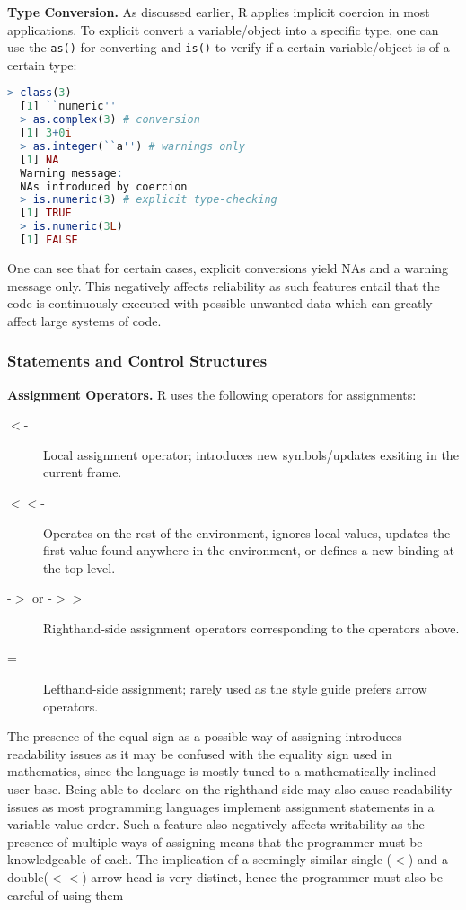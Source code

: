 \documentclass[12pt]{article}
\begin{document}
\textbf{Type Conversion.} As discussed earlier, R applies implicit coercion in most applications. To explicit convert a variable/object into a specific type, one can use the \texttt{as()} for converting and \texttt{is()} to verify if a certain variable/object is of a certain type:

\begin{lstlisting}[language=R ]
  > class(3)
  [1] ``numeric''
  > as.complex(3) # conversion
  [1] 3+0i
  > as.integer(``a'') # warnings only
  [1] NA
  Warning message:
  NAs introduced by coercion
  > is.numeric(3) # explicit type-checking
  [1] TRUE
  > is.numeric(3L)
  [1] FALSE
\end{lstlisting}

One can see that for certain cases, explicit conversions yield NAs and a warning message only. This negatively affects reliability as such features entail that the code is continuously executed with possible unwanted data which can greatly affect large systems of code.

\subsubsection{Statements and Control Structures}

\textbf{Assignment Operators.} R uses the following operators for assignments:

\begin{description}
\item[\(<\)-] Local assignment operator; introduces new symbols/updates exsiting in the current frame.
\item[\(<<\)-] Operates on the rest of the environment, ignores local values, updates the first value found anywhere in the environment, or defines a new binding at the top-level.
\item [-\(>\) or -\(>>\)] Righthand-side assignment operators corresponding to the operators above.
\item[=] Lefthand-side assignment; rarely used as the style guide prefers arrow operators.
\end{description}

The presence of the equal sign as a possible way of assigning introduces readability issues as it may be confused with the equality sign used in mathematics, since the language is mostly tuned to a mathematically-inclined user base. Being able to declare on the righthand-side may also cause readability issues as most programming languages implement assignment statements in a variable-value order. Such a feature also negatively affects writability as the presence of multiple ways of assigning means that the programmer must be knowledgeable of each. The implication of a seemingly similar single (\(<\)) and a double(\(<<\)) arrow head is very distinct, hence the programmer must also be careful of using them
\end{document}
